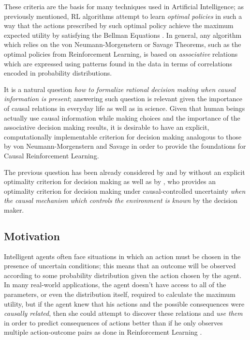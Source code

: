 \documentclass[review]{elsarticle}
\begin{document}
These criteria are the basis for many techniques used in Artificial Intelligence; as previously mentioned, RL algorithms attempt to learn \textit{optimal policies} in such a way that the actions prescribed by such optimal policy achieve the maximum expected utility by satisfying the Bellman Equations \citep{sutton1998reinforcement,webb2007game}. In general, any algorithm which relies on the von Neumann-Morgenstern or Savage Theorems, such as the optimal policies from Reinforcement Learning, is based on \textit{associative} relations which are expressed using patterns found in the data in terms of correlations encoded in probability distributions. 

It is a natural question \textit{how to formalize rational decision making when causal information is present}; answering such question is relevant given the importance of causal relations in everyday life as well as in science. Given that human beings actually use causal information while making choices and the importance of the associative decision making results, it is desirable to have an explicit, computationally implementable criterion for decision making analogous to those by von Neumann-Morgenstern and Savage in order to provide the foundations for Causal Reinforcement Learning.

The previous question has been already considered by \cite{nozick1969newcomb,lewis1981causal} and by \cite{joyce1999foundations} without an explicit optimality criterion for decision making as well as by \cite{pearl2009causality}, who provides an optimality criterion for decision making under causal-controlled uncertainty \textit{when the causal mechanism which controls the environment is known} by the decision maker. 

\subsection{Motivation}
Intelligent agents often face situations in which an action must be chosen in the presence of uncertain conditions; this means that an outcome will be observed according to some probability distribution given the action chosen by the agent. In many real-world applications, the agent doesn't have access to all of the parameters, or even the distribution itself, required to calculate the maximum utility, but if the agent knew that his actions and the possible consequences were \textit{causally related}, then she could attempt to discover these relations and \textit{use them} in order to predict consequences of actions better than if he only observes multiple action-outcome pairs as done in Reinforcement Learning \citep{sutton1998reinforcement}. 
	
\end{document}

